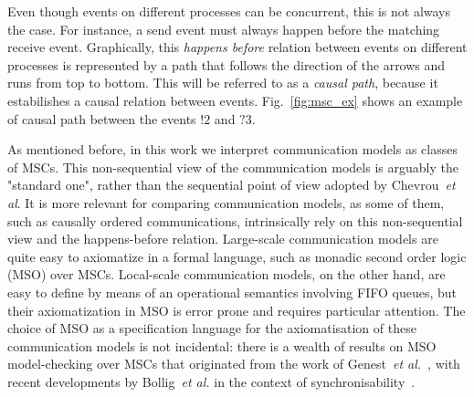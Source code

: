 \noindent Even though events on different processes can be concurrent, this is not always the case. For instance, a send event must always happen
before the matching receive event. Graphically, this \emph{happens before} relation between events on different processes is represented
by a path that follows the direction of the arrows and runs from top to bottom. This will be referred to as a \emph{causal path}, because it
estabilishes a causal relation between events. Fig.~\ref{fig:msc_ex} shows an example of causal path between the events $!2$ and $?3$. 






As mentioned before, in this work we interpret communication models as classes of MSCs.
This non-sequential view of the communication models is arguably the "standard one",
rather than the sequential point of view adopted by Chevrou~\emph{et al}. It is more relevant for comparing communication models, as some
of them, such as causally ordered communications, intrinsically rely on this non-sequential view and the happens-before relation. Large-scale communication models are quite easy to axiomatize in a formal language, such as monadic second order logic (MSO) over MSCs. Local-scale
communication models, on the other hand, are easy to define by means of an operational semantics involving FIFO queues, but their axiomatization
in MSO is error prone and requires particular attention. The choice of MSO as a specification language for the axiomatisation of
these communication models is not incidental: there is a wealth of results on MSO model-checking over MSCs that originated from
the work of Genest~\emph{et al.}~\cite{genest2004kleene,GKM07}, with recent developments by Bollig~\emph{et al.} in the context
of synchronisability~\cite{BolligGFLLS21}.

